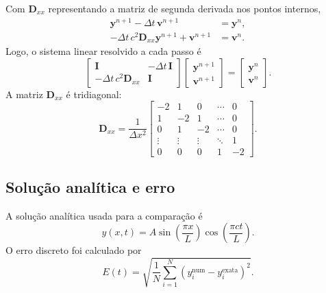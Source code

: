 \documentclass[12pt,a4paper]{article}
\begin{document}
Com $\mathbf{D}_{xx}$ representando a matriz de segunda derivada nos pontos internos,
\begin{align}
    \mathbf{y}^{n+1}-\Delta t\,\mathbf{v}^{n+1}&=\mathbf{y}^n,\\
    -\Delta t\,c^2\mathbf{D}_{xx}\mathbf{y}^{n+1}+\mathbf{v}^{n+1}&=\mathbf{v}^n.
\end{align}
Logo, o sistema linear resolvido a cada passo é
\begin{equation}
    \begin{bmatrix}
        \mathbf{I} & -\Delta t\,\mathbf{I}\\
        -\Delta t\,c^2\mathbf{D}_{xx} & \mathbf{I}
    \end{bmatrix}
    \begin{bmatrix}
        \mathbf{y}^{n+1}\\
        \mathbf{v}^{n+1}
    \end{bmatrix}
    =
    \begin{bmatrix}
        \mathbf{y}^{n}\\
        \mathbf{v}^{n}
    \end{bmatrix}.
\end{equation}
A matriz $\mathbf{D}_{xx}$ é tridiagonal:
\begin{equation}
    \mathbf{D}_{xx}
    =
    \frac{1}{\Delta x^2}
    \begin{bmatrix}
        -2 & 1 & 0 & \cdots & 0\\
        1 & -2 & 1 & \cdots & 0\\
        0 & 1 & -2 & \cdots & 0\\
        \vdots & \vdots & \vdots & \ddots & 1\\
        0 & 0 & 0 & 1 & -2
    \end{bmatrix}.
\end{equation}

\subsection{Solução analítica e erro}

A solução analítica usada para a comparação é
\begin{equation}
    y(x,t)=A\sin\left(\frac{\pi x}{L}\right)\cos\left(\frac{\pi c t}{L}\right).
\end{equation}
O erro discreto foi calculado por
\begin{equation}
    E(t)=\sqrt{\frac{1}{N}\sum_{i=1}^{N}\left(y_i^{\mathrm{num}}-y_i^{\mathrm{exata}}\right)^2}.
\end{equation}
\end{document}
